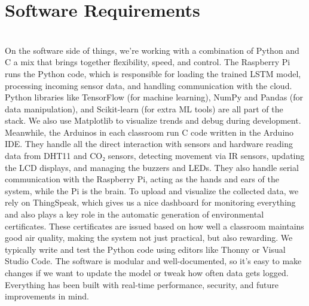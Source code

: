 \section{Software Requirements}\\
On the software side of things, we’re working with a combination of Python and C a mix that brings together flexibility, speed, and control. The Raspberry Pi runs the Python code, which is responsible for loading the trained LSTM model, processing incoming sensor data, and handling communication with the cloud. Python libraries like TensorFlow (for machine learning), NumPy and Pandas (for data manipulation), and Scikit-learn (for extra ML tools) are all part of the stack. We also use Matplotlib to visualize trends and debug during development. Meanwhile, the Arduinos in each classroom run C code written in the Arduino IDE. They handle all the direct interaction with sensors and hardware reading data from DHT11 and CO₂ sensors, detecting movement via IR sensors, updating the LCD displays, and managing the buzzers and LEDs. They also handle serial communication with the Raspberry Pi, acting as the hands and ears of the system, while the Pi is the brain. To upload and visualize the collected data, we rely on ThingSpeak, which gives us a nice dashboard for monitoring everything and also plays a key role in the automatic generation of environmental certificates. These certificates are issued based on how well a classroom maintains good air quality, making the system not just practical, but also rewarding. We typically write and test the Python code using editors like Thonny or Visual Studio Code. The software is modular and well-documented, so it's easy to make changes if we want to update the model or tweak how often data gets logged. Everything has been built with real-time performance, security, and future improvements in mind.



